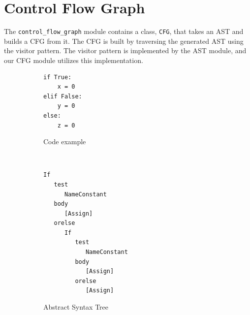 \section{Control Flow Graph}
The \texttt{control\_flow\_graph} module contains a class, \texttt{CFG}, that takes an AST and builds a CFG from it.
The CFG is built by traversing the generated AST using the visitor pattern.\cite{design_patterns}
The visitor pattern is implemented by the AST module, and our CFG module utilizes this implementation.

\begin{figure}[H]
  \begin{subfigure}[b]{0.2\textwidth}
    \begin{lstlisting}[style=python]
if True:
    x = 0
elif False:
    y = 0
else:
    z = 0
    \end{lstlisting}
    \caption{Code example}
    \label{CFG_if_code}
  \end{subfigure}
  ~~~ %
  \begin{subfigure}[b]{0.4\textwidth}
    \begin{lstlisting}[style=default, basicstyle=\footnotesize, numbers=none]
If
   test
      NameConstant
   body
      [Assign]
   orelse
      If
         test
            NameConstant
         body
            [Assign]
         orelse
            [Assign]
    \end{lstlisting}
    \caption{Abstract Syntax Tree}
    \label{CFG_if_ast}
  \end{subfigure}
  ~
  \begin{subfigure}[b]{0.3\textwidth}
    \centering

\end{subfigure}
\end{figure}

